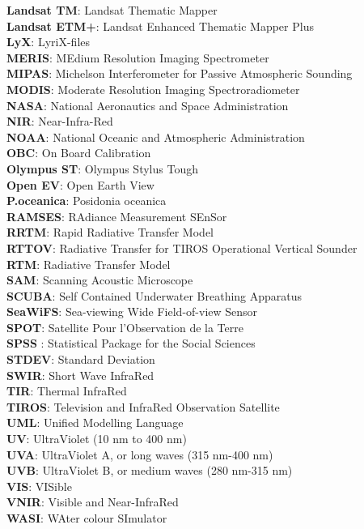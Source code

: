 \documentclass[10pt, a4paper]{article}
\begin{document}
\textbf{Landsat TM}:	 Landsat Thematic Mapper \\
\textbf{Landsat ETM+}:	Landsat Enhanced Thematic Mapper Plus\\
\textbf{LyX}: 		LyriX-files\\
\textbf{MERIS}:		MEdium Resolution Imaging Spectrometer\\
\textbf{MIPAS}:		Michelson Interferometer for Passive Atmospheric Sounding\\
\textbf{MODIS}:	Moderate Resolution Imaging Spectroradiometer\\
\textbf{NASA}:		National Aeronautics and Space Administration\\
\textbf{NIR}:		 Near-Infra-Red\\
\textbf{NOAA}:		 National Oceanic and Atmospheric Administration\\
\textbf{OBC}:		On Board Calibration\\
\textbf{Olympus ST}: 	 Olympus Stylus Tough\\
\textbf{Open EV}: 	Open Earth View\\
\textbf{P.oceanica}:	Posidonia oceanica\\
\textbf{RAMSES}:	RAdiance Measurement SEnSor\\
\textbf{RRTM}:		Rapid Radiative Transfer Model\\
\textbf{RTTOV}: 	Radiative Transfer for TIROS Operational Vertical Sounder\\
\textbf{RTM}:		Radiative Transfer Model\\
\textbf{SAM}:		Scanning Acoustic Microscope\\
\textbf{SCUBA}:	Self Contained Underwater Breathing Apparatus\\
\textbf{SeaWiFS}: 	Sea-viewing Wide Field-of-view Sensor\\
\textbf{SPOT}:		Satellite Pour l'Observation de la Terre\\
\textbf{SPSS	}:	Statistical Package for the Social Sciences\\
\textbf{STDEV}:		Standard Deviation\\
\textbf{SWIR}: 		Short Wave InfraRed\\
\textbf{TIR}: 		Thermal InfraRed\\
\textbf{TIROS}: 	Television and InfraRed Observation Satellite\\
\textbf{UML}:		Unified Modelling Language\\
\textbf{UV}:		UltraViolet (10 nm to 400 nm)\\
\textbf{UVA}:		UltraViolet A, or long waves (315 nm-400 nm)\\
\textbf{UVB}:		 UltraViolet B, or medium waves (280 nm-315 nm)\\
\textbf{VIS}:		VISible\\
\textbf{VNIR}:		Visible and Near-InfraRed\\
\textbf{WASI}:		WAter colour SImulator\\
\end{document}
